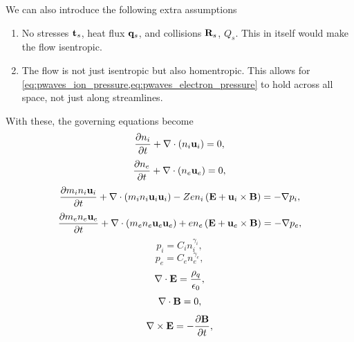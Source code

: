 \documentclass[a4paper,11pt]{report}
\begin{document}
We can also introduce the following extra assumptions
\begin{enumerate}
    \item No stresses $\mathbf{t}_s$, heat flux $\mathbf{q}_s$, and collisions $\mathbf{R}_s$, $Q_s$. This in itself would make the flow isentropic.
    \item The flow is not just isentropic but also homentropic. This allows for \cref{eq:pwaves_ion_pressure,eq:pwaves_electron_pressure} to hold across all space, not just along streamlines.
\end{enumerate}
With these, the governing equations become
\begin{equation}
    \label{eq:pwaves_ion_density}
    \frac{\partial n_i}{\partial t} + \nabla \cdot \left (n_i \mathbf{u}_i \right ) = 0,
\end{equation}
\begin{equation}
    \label{eq:pwaves_electron_density}
    \frac{\partial n_e}{\partial t} + \nabla \cdot \left (n_e \mathbf{u}_e \right ) = 0,
\end{equation}
\begin{equation}
    \label{eq:pwaves_ion_momentum}
    \frac{\partial m_i n_i \mathbf{u}_i}{\partial t} + \nabla \cdot \left ( m_i n_i \mathbf{u}_i \mathbf{u}_i \right ) - Ze n_i \left ( \mathbf{E} + \mathbf{u}_i \times \mathbf{B} \right ) = -\nabla p_i,
\end{equation}
\begin{equation}
    \label{eq:pwaves_electron_momentum}
    \frac{\partial m_e n_e \mathbf{u}_e}{\partial t} + \nabla \cdot \left ( m_e n_e \mathbf{u}_e \mathbf{u}_e \right ) + e n_e \left ( \mathbf{E} + \mathbf{u}_e \times \mathbf{B} \right ) = -\nabla p_e,
\end{equation}
\begin{equation}
    \label{eq:pwaves_ion_pressure}
    p_i = C_i n_i^{\gamma_i},
\end{equation}
\begin{equation}
    \label{eq:pwaves_electron_pressure}
    p_e = C_e n_e^{\gamma_e},
\end{equation}
\begin{equation}
    \label{eq:pwaves_maxwell_3}
    \nabla \cdot \mathbf{E} = \frac{\rho_q}{\epsilon_0},
\end{equation}
\begin{equation}
    \label{eq:p_waves_maxwell_4}
    \nabla \cdot \mathbf{B} = 0,
\end{equation}
\begin{equation}
    \label{eq:p_waves_maxwell_1}
    \nabla \times \mathbf{E} = -\frac{ \partial \mathbf{B}}{\partial t},
\end{equation}
\end{document}
